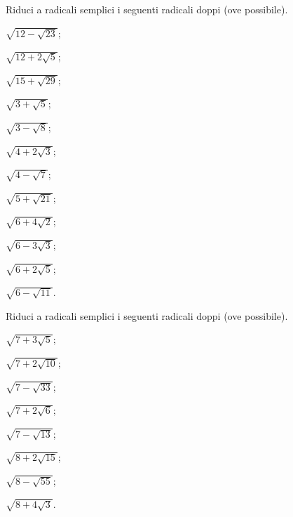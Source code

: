 \begin{esercizio}[\Ast]
 \label{ese:2.96}
Riduci a radicali semplici i seguenti radicali doppi (ove possibile).
 \begin{multicols}{4}
 \begin{enumeratea}
 \item $\sqrt{12-\sqrt{23}}$;
 \item $\sqrt{12+2\sqrt 5}$;
 \item $\sqrt{15+\sqrt{29}}$;
 \item $\sqrt{3+\sqrt 5}$;
 \item $\sqrt{3-\sqrt 8}$;
 \item $\sqrt{4+2\sqrt 3}$;
 \item $\sqrt{4-\sqrt 7}$;
 \item $\sqrt{5+\sqrt{21}}$;
 \item $\sqrt{6+4\sqrt 2}$;
 \item $\sqrt{6-3\sqrt 3}$;
 \item $\sqrt{6+2\sqrt 5}$;
 \item $\sqrt{6-\sqrt{11}}$.
 \end{enumeratea}
 \end{multicols}
\end{esercizio}

\begin{esercizio}[\Ast]
 \label{ese:2.97}
Riduci a radicali semplici i seguenti radicali doppi (ove possibile).
 \begin{multicols}{4}
 \begin{enumeratea}
 \item $\sqrt{7+3\sqrt 5}$;
 \item $\sqrt{7+2\sqrt{10}}$;
 \item $\sqrt{7-\sqrt{33}}$;
 \item $\sqrt{7+2\sqrt 6}$;
 \item $\sqrt{7-\sqrt{13}}$;
 \item $\sqrt{8+2\sqrt{15}}$;
 \item $\sqrt{8-\sqrt{55}}$;
 \item $\sqrt{8+4\sqrt 3}$.
 \end{enumeratea}
 \end{multicols}
\end{esercizio}

